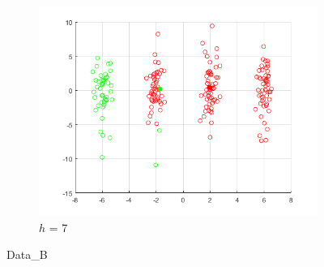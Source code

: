 \documentclass[12pt]{article}
\begin{document}
\begin{figure}[H]
\begin{subfigure}{0.25\textwidth}
  \includegraphics[width=\linewidth]{figs/1-b-meanshift-b-7.png}
  \caption{$h$ = 7}
  \label{fig:6}
\end{subfigure}
\caption{Data\_B}
\label{fig:images}
\end{figure}
\end{document}
